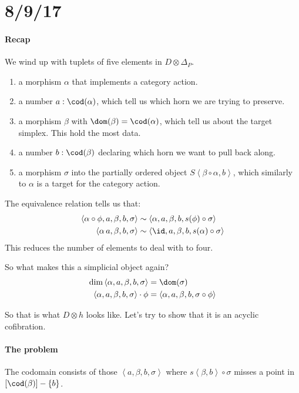 \documentclass{tac}
\newcommand\set[1]{\left\{#1\right\}}
\newcommand\of{:}
\newcommand\simplex\Delta
\newcommand\tuplet[1]{\left\langle #1 \right\rangle}
\begin{document}
\section{8/9/17}

\paragraph{Recap}
We wind up with tuplets of five elements in $D\otimes \simplex_P$.
\begin{enumerate}
\item a morphism $\alpha$ that implements a category action.
\item a number $a\of\cod(\alpha)$, which tell us which horn we are trying to preserve.
\item a morphism $\beta$ with $\dom(\beta) = \cod(\alpha)$, which tell us about the target simplex. This hold the most data.
\item a number $b\of \cod(\beta)$ declaring which horn we want to pull back along.
\item a morphism $\sigma$ into the partially ordered object $S\tuplet{\beta\circ \alpha,b}$, which similarly to $\alpha$ is a target for the category action.
\end{enumerate}
The equivalence relation tells us that:
\begin{align*}
\tuplet{\alpha\circ\phi,a,\beta,b,\sigma}&\sim
\tuplet{\alpha,a,\beta,b,s(\phi)\circ\sigma}\\
\tuplet{\alpha\,a,\beta,b,\sigma}&\sim
\tuplet{\id,a,\beta,b,s(\alpha)\circ\sigma}\\
\end{align*}
This reduces the number of elements to deal with to four.

So what makes this a simplicial object again? 
\begin{align*}
\dim\tuplet{\alpha,a,\beta,b,\sigma} &= \dom(\sigma)\\
\tuplet{\alpha,a,\beta,b,\sigma}\cdot\phi &= \tuplet{\alpha,a,\beta,b,\sigma\circ \phi}
\end{align*}

So that is what $D\otimes h$ looks like. Let's try to show that it is an acyclic cofibration.

\paragraph{The problem}
The codomain consists of those $\tuplet{a,\beta,b,\sigma}$ where $s\tuplet{\beta,b}\circ\sigma$ misses a point in $[\cod(\beta)]-\set b$.
\end{document}
